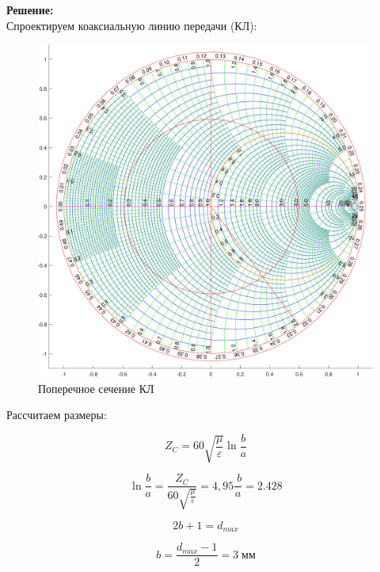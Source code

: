 \documentclass[fontsize=14pt,a4paper]{scrartcl}
\begin{document}
    {\bfseries Решение:}\\ 
    \indent Спроектируем коаксиальную линию передачи (КЛ):

    \begin{figure}[h!]
      \centering
      \includegraphics[scale=0.7]{data/lab_6/fig/smith}
      \caption{Поперечное сечение КЛ}
      \label{fig:ris1}
    \end{figure}

    \indent Рассчитаем размеры:

    \begin{equation}
      Z_C=60\sqrt{\frac{\mu}{\varepsilon}}\ln{\frac{b}{a}}
    \end{equation}

    \begin{equation}
      \ln{\frac{b}{a}}=\frac{Z_C}{60\sqrt{\frac{\mu}{\varepsilon}}}=4,95    \frac{\ b}{a}=2.428
    \end{equation}

    \begin{equation}
      2b+1=d_{max}
    \end{equation}

    \begin{equation}
      b=\frac{d_{max}-1}{2}=3\; \text{мм}
    \end{equation}
\end{document}
